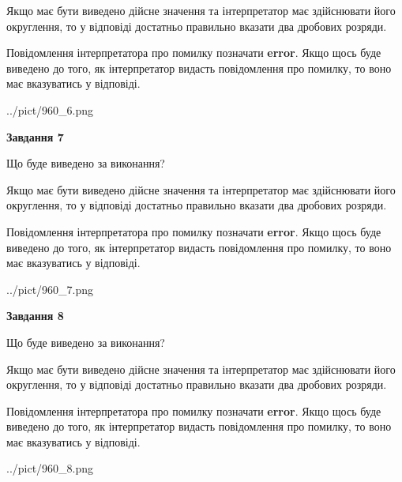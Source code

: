 \documentclass[12pt, ukrainian]{article}
\begin{document}
{\begin {Large}
Якщо має бути виведено дійсне значення та інтерпретатор має здійснювати його округлення, 
то у відповіді достатньо правильно вказати два дробових розряди.

Повідомлення інтерпретатора про помилку позначати \textbf{error}.
Якщо щось буде виведено до того, як інтерпретатор видасть повідомлення про помилку, 
то воно має вказуватись у відповіді. \par

\begin{center}
	{../pict/960_6.png}
\end{center}
\newpage

{\begin {center}\textbf{Завдання 7}\end {center}}\par
Що буде виведено за виконання? \par

Якщо має бути виведено дійсне значення та інтерпретатор має здійснювати його округлення, 
то у відповіді достатньо правильно вказати два дробових розряди.

Повідомлення інтерпретатора про помилку позначати \textbf{error}.
Якщо щось буде виведено до того, як інтерпретатор видасть повідомлення про помилку, 
то воно має вказуватись у відповіді. \par

\begin{center}
	{../pict/960_7.png}
\end{center}
\newpage

{\begin {center}\textbf{Завдання 8}\end {center}}\par
Що буде виведено за виконання? \par

Якщо має бути виведено дійсне значення та інтерпретатор має здійснювати його округлення, 
то у відповіді достатньо правильно вказати два дробових розряди.

Повідомлення інтерпретатора про помилку позначати \textbf{error}.
Якщо щось буде виведено до того, як інтерпретатор видасть повідомлення про помилку, 
то воно має вказуватись у відповіді. \par

\begin{center}
	{../pict/960_8.png}
\end{center}
\newpage


\end{Large}}
\end{document}
